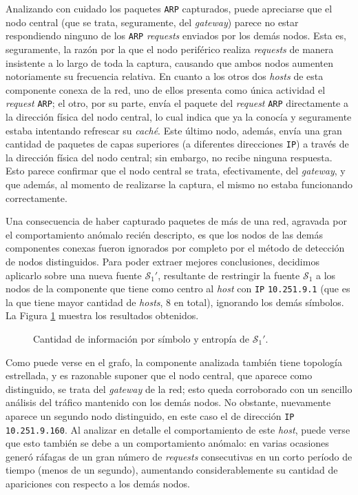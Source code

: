 Analizando con cuidado los paquetes \texttt{ARP} capturados, puede apreciarse
que el nodo central (que se trata, seguramente, del \emph{gateway}) parece no
estar respondiendo ninguno de los \texttt{ARP} \emph{requests} enviados por
los demás nodos. Esta es, seguramente, la razón por la que el nodo periférico
realiza \emph{requests} de manera insistente a lo largo de toda la captura,
causando que ambos nodos aumenten notoriamente su frecuencia relativa. En
cuanto a los otros dos \emph{hosts} de esta componente conexa de la red, uno
de ellos presenta como única actividad el \emph{request} \texttt{ARP}; el
otro, por su parte, envía el paquete del \emph{request} \texttt{ARP}
directamente a la dirección física del nodo central, lo cual indica que ya la
conocía y seguramente estaba intentando refrescar su \emph{caché}. Este último
nodo, además, envía una gran cantidad de paquetes de capas superiores (a
diferentes direcciones \texttt{IP}) a través de la dirección física del nodo
central; sin embargo, no recibe ninguna respuesta. Esto parece confirmar que
el nodo central se trata, efectivamente, del \emph{gateway}, y que además, al
momento de realizarse la captura, el mismo no estaba funcionando
correctamente.

Una consecuencia de haber capturado paquetes de más de una red, agravada por
el comportamiento anómalo recién descripto, es que los nodos de las demás
componentes conexas fueron ignorados por completo por el método de detección
de nodos distinguidos. Para poder extraer mejores conclusiones, decidimos
aplicarlo sobre una nueva fuente $\mathcal{S}_1'$, resultante de restringir la
fuente $\mathcal{S}_1$ a los nodos de la componente que tiene como centro al
\emph{host} con \texttt{IP} \texttt{10.251.9.1} (que es la que tiene mayor
cantidad de \emph{hosts}, 8 en total), ignorando los demás símbolos. La Figura
\ref{res:esc3:s1prime} muestra los resultados obtenidos.

\begin{figure}[H]
    \caption{Cantidad de información por símbolo y entropía de $\mathcal{S}_1'$.}
    \label{res:esc3:s1prime}
\end{figure}

Como puede verse en el grafo, la componente analizada también tiene topología
estrellada, y es razonable suponer que el nodo central, que aparece como
distinguido, se trata del \emph{gateway} de la red; esto queda corroborado con
un sencillo análisis del tráfico mantenido con los demás nodos. No obstante,
nuevamente aparece un segundo nodo distinguido, en este caso el de dirección
\texttt{IP} \texttt{10.251.9.160}. Al analizar en detalle el comportamiento de
este \emph{host}, puede verse que esto también se debe a un comportamiento
anómalo: en varias ocasiones generó ráfagas de un gran número de
\emph{requests} consecutivas en un corto período de tiempo (menos de un
segundo), aumentando considerablemente su cantidad de apariciones con respecto
a los demás nodos.


